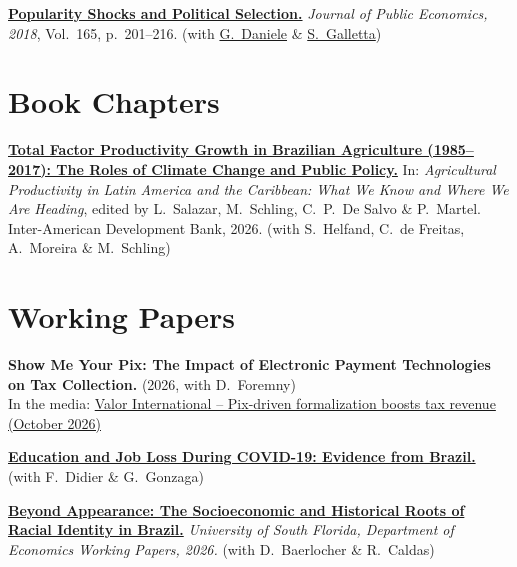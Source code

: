 \documentclass[a4paper,9pt]{article}
\newcommand{\cvgap}{\vspace{2mm}}
\begin{document}
\cvgap

\textbf{\href{https://www.sciencedirect.com/science/article/pii/S0047272718301361}{Popularity Shocks and Political Selection.}} \emph{Journal of Public Economics, 2018}, Vol.~165, p.~201--216. (with \href{http://www.gianmarcodaniele.com/}{G.~Daniele} \& \href{http://sergio-galletta.com/}{S.~Galletta})

\section{Book Chapters}

\textbf{\href{https://doi.org/10.18235/0014396}{Total Factor Productivity Growth in Brazilian Agriculture (1985--2017): The Roles of Climate Change and Public Policy.}} In: \emph{Agricultural Productivity in Latin America and the Caribbean: What We Know and Where We Are Heading}, edited by L.~Salazar, M.~Schling, C.~P.~De Salvo \& P.~Martel. Inter-American Development Bank, 2026. (with S.~Helfand, C.~de Freitas, A.~Moreira \& M.~Schling)

\section{Working Papers}

\textbf{Show Me Your Pix: The Impact of Electronic Payment Technologies on Tax Collection.} (2026, with D.~Foremny) \\
\hspace{2em} In the media: \href{https://valorinternational.globo.com/business/news/2026/10/27/pix-driven-formalization-boosts-tax-revenue.ghtml}{Valor International -- Pix-driven formalization boosts tax revenue (October 2026)}

\cvgap

\textbf{\href{https://www.researchgate.net/profile/Francisco-Cavalcanti-6/publication/406502168_Education_and_Job_Loss_During_COVID-19_Evidence_from_Brazil/links/6a29d64a68552924bb0049a2/Education-and-Job-Loss-During-COVID-19-Evidence-from-Brazil.pdf}{Education and Job Loss During COVID-19: Evidence from Brazil.}} (with F.~Didier \& G.~Gonzaga)

\cvgap

\textbf{\href{https://ideas.repec.org/p/usf/wpaper/2026-01.html}{Beyond Appearance: The Socioeconomic and Historical Roots of Racial Identity in Brazil.}} \emph{University of South Florida, Department of Economics Working Papers, 2026.} (with D.~Baerlocher \& R.~Caldas)

\cvgap
\end{document}
